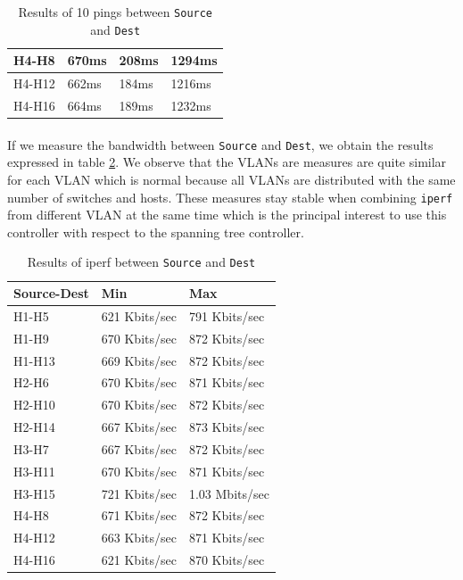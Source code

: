 \documentclass[a4paper, 11pt, oneside]{article}
\begin{document}
\begin{table}[H]
\begin{tabular}{|l|l|l|l|}
    H4-H8                                    & 670ms                              & 208ms                              & 1294ms                                 \\ \hline
    H4-H12                                     & 662ms                              & 184ms                              & 1216ms                                 \\ \hline
    H4-H16                                     & 664ms                              & 189ms                              & 1232ms                                 \\ \hline
    \end{tabular}
    \caption{Results of 10 pings between \texttt{Source} and \texttt{Dest}}
    \label{table:VLANs_pings}
    \end{table}

\paragraph{}If we measure the bandwidth between \texttt{Source} and \texttt{Dest}, we obtain the results expressed in table \ref{table:VLANs_bw}. We observe that the VLANs are measures are quite similar for each VLAN which is normal because all VLANs are distributed with the same number of switches and hosts. These measures stay stable when combining \texttt{iperf} from different VLAN at the same time which is the principal interest to use this controller with respect to the spanning tree controller.
\begin{table}[H]
    \centering
    \begin{tabular}{|l|l|l|}
    \hline
    \textbf{Source-Dest} & \textbf{Min}  & \textbf{Max}   \\ \hline
    H1-H5                & 621 Kbits/sec & 791 Kbits/sec  \\ \hline
    H1-H9                & 670 Kbits/sec & 872 Kbits/sec  \\ \hline
    H1-H13               & 669 Kbits/sec & 872 Kbits/sec  \\ \hline
    H2-H6                & 670 Kbits/sec & 871 Kbits/sec  \\ \hline
    H2-H10               & 670 Kbits/sec & 872 Kbits/sec  \\ \hline
    H2-H14               & 667 Kbits/sec & 873 Kbits/sec  \\ \hline
    H3-H7                & 667 Kbits/sec & 872 Kbits/sec  \\ \hline
    H3-H11               & 670 Kbits/sec & 871 Kbits/sec  \\ \hline
    H3-H15               & 721 Kbits/sec & 1.03 Mbits/sec \\ \hline
    H4-H8                & 671 Kbits/sec & 872 Kbits/sec  \\ \hline
    H4-H12               & 663 Kbits/sec & 871 Kbits/sec  \\ \hline
    H4-H16               & 621 Kbits/sec & 870 Kbits/sec  \\ \hline
    \end{tabular}
    \caption{Results of iperf between \texttt{Source} and \texttt{Dest}}
    \label{table:VLANs_bw}
    \end{table}
\end{document}

